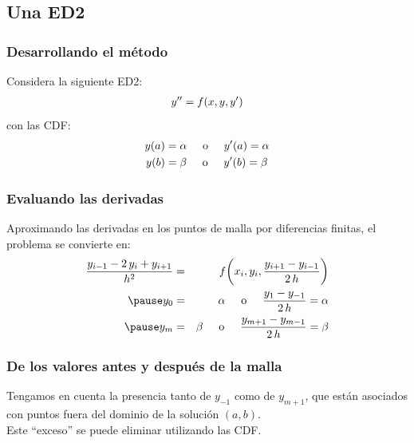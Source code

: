 \documentclass[12pt]{beamer}
\begin{document}
\subsection{Una ED2}

\begin{frame}
\frametitle{Desarrollando el método}
Considera la siguiente ED2:
\pause
\begin{align*}
{y}^{\prime \prime} = f (x, y, {y}^{\prime})
\end{align*}
\pause
con las CDF:
\begin{align*}
y (a) &= \alpha \hspace{0.5cm} \text{o} \hspace{0.5cm} {y}^{\prime} (a) = \alpha \\
y (b) &= \beta \hspace{0.5cm} \text{o} \hspace{0.5cm} {y}^{\prime} (b) = \beta
\end{align*}
\end{frame}
\begin{frame}
\frametitle{Evaluando las derivadas}
Aproximando las derivadas en los puntos de malla por diferencias finitas, el problema se convierte en:
\pause
\begin{eqnarray}
\dfrac{y_{i-1} - 2 \, y_{i} +  y_{i+1}}{h^{2}} &=& f \bigg( x_{i}, y_{i}, \dfrac{y_{i+1} - y_{i-1}}{2 \, h} \bigg) \label{eq:ecuacion_08_09} \\ \pause
y_{0} &=& \alpha \hspace{0.5cm} \text{o} \hspace{0.5cm} \dfrac{y_{1} - y_{-1}}{2 \, h} = \alpha \label{eq:ecuacion_08_10a} \\ \pause
y_{m} &=& \beta \hspace{0.5cm} \text{o} \hspace{0.5cm} \dfrac{y_{m+1} - y_{m-1}}{2 \, h} = \beta \label{eq:ecuacion_08_10b}
\end{eqnarray}
\end{frame}
\begin{frame}
\frametitle{De los valores antes y después de la malla}
Tengamos en cuenta la presencia tanto de $y_{-1}$ como de $y_{m+1}$, \pause que están asociados con puntos fuera del dominio de la solución $(a,b)$.
\\
\bigskip
\pause
Este \enquote{exceso} se puede eliminar utilizando las CDF.
\end{frame}
\end{document}
